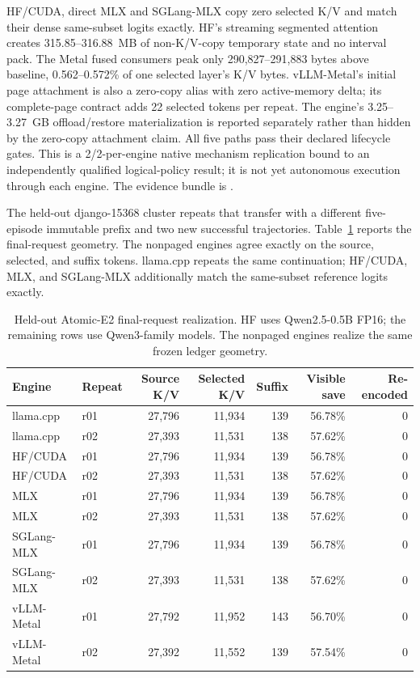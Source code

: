 \documentclass[11pt]{article}
\begin{document}
HF/CUDA, direct MLX and SGLang-MLX copy zero selected K/V and match their dense
same-subset logits exactly.  HF's streaming segmented attention creates
315.85--316.88~MB of non-K/V-copy temporary state and no interval pack.  The
Metal fused consumers peak only
290,827--291,883 bytes above baseline, 0.562--0.572\% of one selected layer's
K/V bytes.  vLLM-Metal's initial page attachment is also a zero-copy alias with
zero active-memory delta; its complete-page contract adds 22 selected tokens
per repeat.  The engine's 3.25--3.27~GB offload/restore materialization is
reported separately rather than hidden by the zero-copy attachment claim.
All five paths pass their declared lifecycle gates.  This is a 2/2-per-engine
native mechanism replication bound to an independently qualified logical-policy
result; it is not yet autonomous execution through each engine.  The evidence bundle is
.

The held-out django-15368 cluster repeats that transfer with a different
five-episode immutable prefix and two new successful trajectories.  Table~\ref{tab:agent-atomic-e2-django-engines}
reports the final-request geometry.  The nonpaged engines agree exactly on the
source, selected, and suffix tokens.  llama.cpp repeats the same continuation;
HF/CUDA, MLX, and SGLang-MLX additionally match the same-subset reference
logits exactly.

\begin{table}[H]
\centering
\small
\caption{Held-out Atomic-E2 final-request realization.  HF uses
Qwen2.5-0.5B FP16; the remaining rows use Qwen3-family models.  The nonpaged
engines realize the same frozen ledger geometry.}
\begin{tabular}{llrrrrr}
\toprule
Engine & Repeat & Source K/V & Selected K/V & Suffix & Visible save & Re-encoded \\
\midrule
llama.cpp & r01 & 27,796 & 11,934 & 139 & 56.78\% & 0 \\
llama.cpp & r02 & 27,393 & 11,531 & 138 & 57.62\% & 0 \\
HF/CUDA & r01 & 27,796 & 11,934 & 139 & 56.78\% & 0 \\
HF/CUDA & r02 & 27,393 & 11,531 & 138 & 57.62\% & 0 \\
MLX & r01 & 27,796 & 11,934 & 139 & 56.78\% & 0 \\
MLX & r02 & 27,393 & 11,531 & 138 & 57.62\% & 0 \\
SGLang-MLX & r01 & 27,796 & 11,934 & 139 & 56.78\% & 0 \\
SGLang-MLX & r02 & 27,393 & 11,531 & 138 & 57.62\% & 0 \\
vLLM-Metal & r01 & 27,792 & 11,952 & 143 & 56.70\% & 0 \\
vLLM-Metal & r02 & 27,392 & 11,552 & 139 & 57.54\% & 0 \\
\bottomrule
\end{tabular}
\label{tab:agent-atomic-e2-django-engines}
\end{table}
\end{document}
